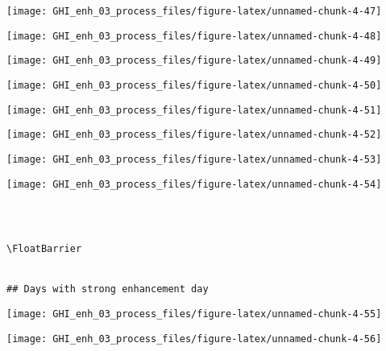 \documentclass[
  10pt,
  a4paper,oneside]{article}
\begin{document}
\begin{center}\texttt{[image: GHI\_enh\_03\_process\_files/figure-latex/unnamed-chunk-4-47]} \end{center}

\begin{center}\texttt{[image: GHI\_enh\_03\_process\_files/figure-latex/unnamed-chunk-4-48]} \end{center}

\begin{center}\texttt{[image: GHI\_enh\_03\_process\_files/figure-latex/unnamed-chunk-4-49]} \end{center}

\begin{center}\texttt{[image: GHI\_enh\_03\_process\_files/figure-latex/unnamed-chunk-4-50]} \end{center}

\begin{center}\texttt{[image: GHI\_enh\_03\_process\_files/figure-latex/unnamed-chunk-4-51]} \end{center}

\begin{center}\texttt{[image: GHI\_enh\_03\_process\_files/figure-latex/unnamed-chunk-4-52]} \end{center}

\begin{center}\texttt{[image: GHI\_enh\_03\_process\_files/figure-latex/unnamed-chunk-4-53]} \end{center}

\begin{center}\texttt{[image: GHI\_enh\_03\_process\_files/figure-latex/unnamed-chunk-4-54]} \end{center}

\begin{verbatim}
 
 

\FloatBarrier


## Days with strong enhancement day 
\end{verbatim}

\begin{center}\texttt{[image: GHI\_enh\_03\_process\_files/figure-latex/unnamed-chunk-4-55]} \end{center}

\begin{center}\texttt{[image: GHI\_enh\_03\_process\_files/figure-latex/unnamed-chunk-4-56]} \end{center}
\end{document}
